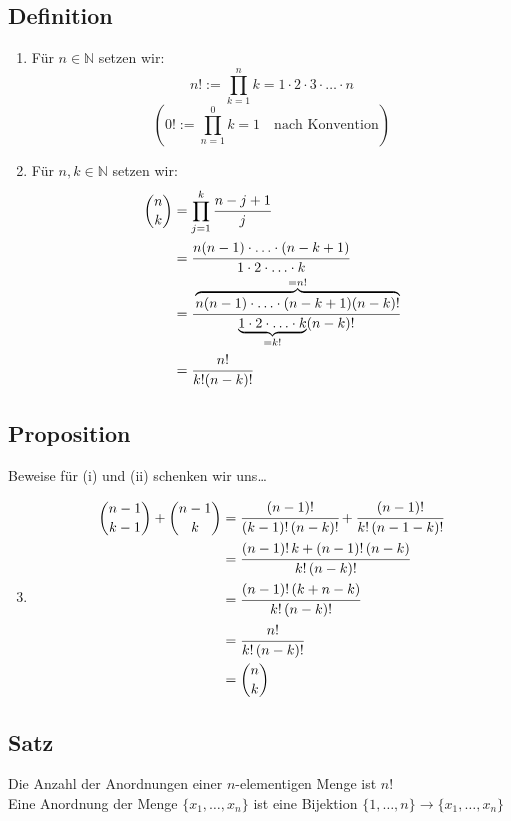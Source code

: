 \subsection{Definition}
\begin{enumerate}
\item Für \(n \in \mathbb{N}\) setzen wir:
\[
\boxed{n! := \prod \limits_{k=1}^{n} k = 1 \cdot 2 \cdot 3 \cdot \ldots \cdot n}
\]
\[
( 0! := \prod \limits_{n=1}^{0} k = 1 \quad \text{nach Konvention})
\]
\item Für \(n,k \in \mathbb{N} \) setzen wir:
\begin{align*}
\binom {n}{k} &= \prod \limits_{j=1}^{k} \cfrac{n-j+1}{j} \\
&= \cfrac{n(n-1)\cdot \ldots \cdot (n-k+1)}{1 \cdot 2 \cdot \ldots \cdot k} \\
&= \cfrac{\overbrace{n(n-1)\cdot \ldots \cdot (n-k+1)(n-k)!}^{=n!}}{\underbrace{1 \cdot 2 \cdot \ldots \cdot k}_{=k!} (n-k)!} \\
&= \cfrac{n!}{k!(n-k)!}
\end{align*}
\end{enumerate}

\subsection{Proposition}
Beweise für (i) und (ii) schenken wir uns…
\begin{enumerate}
\setcounter{enumi}{2}
\item 
\begin{align*}
\binom{n-1}{k-1} + \binom{n-1}{k} &= \cfrac{(n-1)!}{(k-1)! \, (n-k)!} + \cfrac{(n-1)!}{k! \, (n-1-k)!} \\
&= \cfrac{(n-1)! \, k + (n-1)! \, (n-k)}{k! \, (n-k)!} \\
&= \cfrac{(n-1)! \, (k+n-k)}{k! \, (n-k)!} \\
&= \cfrac{n!}{k! \, (n-k)!} \\
&= \binom{n}{k}
\end{align*}
\end{enumerate}
\subsection{Satz}
Die Anzahl der Anordnungen einer \(n\)-elementigen Menge ist \(n!\) \\
Eine Anordnung der Menge \( \{x_1, \ldots, x_n\}\) ist eine Bijektion \(\{ 1, \ldots, n\} \longrightarrow \{ x_1, \ldots, x_n\}\) 
